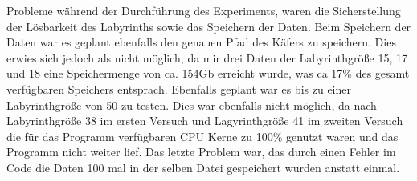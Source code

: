 \documentclass[12pt, a4paper, titlepage]{article}
\begin{document}
\bigskip

Probleme während der Durchführung des Experiments, waren die Sicherstellung der Lösbarkeit des Labyrinths sowie das Speichern der Daten.
Beim Speichern der Daten war es geplant ebenfalls den genauen Pfad des Käfers zu speichern.
Dies erwies sich jedoch als nicht möglich, da mir drei Daten der Labyrinthgröße 15, 17 und 18 eine Speichermenge von ca. 154Gb erreicht wurde, was ca 17\% des gesamt verfügbaren Speichers entsprach.
Ebenfalls geplant war es bis zu einer Labyrinthgröße von 50 zu testen.
Dies war ebenfalls nicht möglich, da nach Labyrinthgröße 38 im ersten Versuch und Lagyrinthgröße 41 im zweiten Versuch die für das Programm verfügbaren CPU Kerne zu 100\% genutzt waren und das Programm nicht weiter lief.
Das letzte Problem war, das durch einen Fehler im Code die Daten 100 mal in der selben Datei gespeichert wurden anstatt einmal.

\newpage

\printbibliography 
\end{document}
